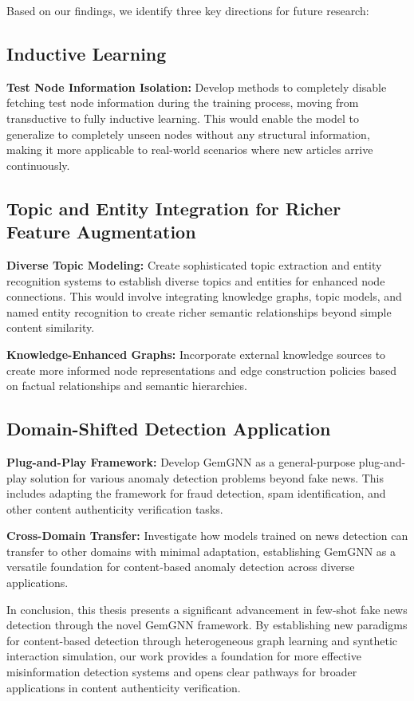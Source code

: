 Based on our findings, we identify three key directions for future research:

\subsection{Inductive Learning}

\textbf{Test Node Information Isolation:} Develop methods to completely disable fetching test node information during the training process, moving from transductive to fully inductive learning. This would enable the model to generalize to completely unseen nodes without any structural information, making it more applicable to real-world scenarios where new articles arrive continuously.

\subsection{Topic and Entity Integration for Richer Feature Augmentation}

\textbf{Diverse Topic Modeling:} Create sophisticated topic extraction and entity recognition systems to establish diverse topics and entities for enhanced node connections. This would involve integrating knowledge graphs, topic models, and named entity recognition to create richer semantic relationships beyond simple content similarity.

\textbf{Knowledge-Enhanced Graphs:} Incorporate external knowledge sources to create more informed node representations and edge construction policies based on factual relationships and semantic hierarchies.

\subsection{Domain-Shifted Detection Application}

\textbf{Plug-and-Play Framework:} Develop GemGNN as a general-purpose plug-and-play solution for various anomaly detection problems beyond fake news. This includes adapting the framework for fraud detection, spam identification, and other content authenticity verification tasks.

\textbf{Cross-Domain Transfer:} Investigate how models trained on news detection can transfer to other domains with minimal adaptation, establishing GemGNN as a versatile foundation for content-based anomaly detection across diverse applications.

In conclusion, this thesis presents a significant advancement in few-shot fake news detection through the novel GemGNN framework. By establishing new paradigms for content-based detection through heterogeneous graph learning and synthetic interaction simulation, our work provides a foundation for more effective misinformation detection systems and opens clear pathways for broader applications in content authenticity verification.

\EndChapter
